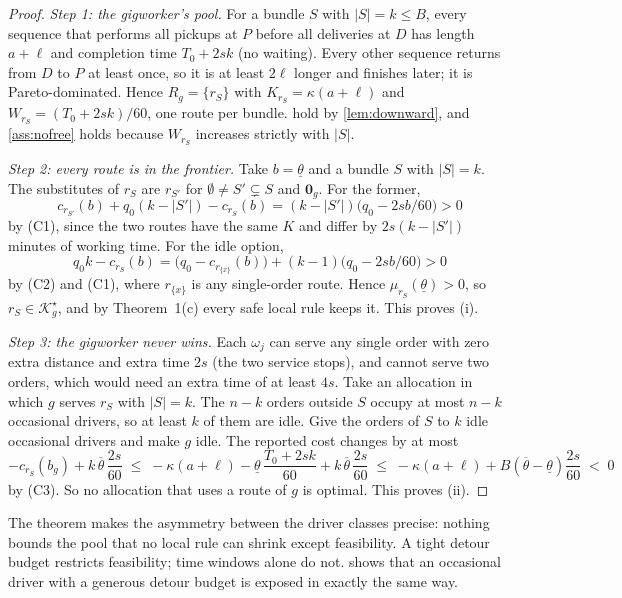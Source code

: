 \documentclass[11pt]{article}
\theoremstyle{definition}
\theoremstyle{remark}
\newcommand{\Ks}{\mathcal{K}^{\star}}
\newcommand{\thl}{\underline{\theta}}
\newcommand{\thu}{\overline{\theta}}
\newcommand{\idle}{\mathbf{0}}
\begin{document}
\begin{proof}
\emph{Step 1: the gigworker's pool.} For a bundle $S$ with $|S|=k\le B$, every
sequence that performs all pickups at $P$ before all deliveries at $D$ has
length $a+\ell$ and completion time $T_0+2sk$ (no waiting). Every other sequence
returns from $D$ to $P$ at least once, so it is at least $2\ell$ longer and
finishes later; it is Pareto-dominated. Hence $R_g=\{r_S\}$ with
$K_{r_S}=\kappa(a+\ell)$ and $W_{r_S}=(T_0+2sk)/60$, one route per bundle.
 hold by \cref{lem:downward}, and \cref{ass:nofree}
holds because $W_{r_S}$ increases strictly with $|S|$.

\emph{Step 2: every route is in the frontier.} Take $b=\thl$ and a bundle $S$
with $|S|=k$. The substitutes of $r_S$ are $r_{S'}$ for
$\emptyset\ne S'\subsetneq S$ and $\idle_g$. For the former,
\[
c_{r_{S'}}(b)+q_0(k-|S'|)-c_{r_S}(b)=(k-|S'|)\bigl(q_0-2sb/60\bigr)>0
\]
by (C1), since the two routes have the same $K$ and differ by $2s(k-|S'|)$
minutes of working time. For the idle option,
\[
q_0k-c_{r_S}(b)=\bigl(q_0-c_{r_{\{x\}}}(b)\bigr)+(k-1)\bigl(q_0-2sb/60\bigr)>0
\]
by (C2) and (C1), where $r_{\{x\}}$ is any single-order route. Hence
$\mu_{r_S}(\thl)>0$, so $r_S\in\Ks_g$, and by Theorem~1(c) every safe local
rule keeps it. This proves (i).

\emph{Step 3: the gigworker never wins.} Each $\omega_j$ can serve any single
order with zero extra distance and extra time $2s$ (the two service stops), and
cannot serve two orders, which would need an extra time of at least $4s$. Take
an allocation in which $g$ serves $r_S$ with $|S|=k$. The $n-k$ orders outside
$S$ occupy at most $n-k$ occasional drivers, so at least $k$ of them are idle.
Give the orders of $S$ to $k$ idle occasional drivers and make $g$ idle. The
reported cost changes by at most
\[
-c_{r_S}(b_g)+k\,\thu\,\frac{2s}{60}
\;\le\;-\kappa(a+\ell)-\thl\,\frac{T_0+2sk}{60}+k\,\thu\,\frac{2s}{60}
\;\le\;-\kappa(a+\ell)+B(\thu-\thl)\frac{2s}{60}\;<\;0
\]
by (C3). So no allocation that uses a route of $g$ is optimal. This proves (ii).
\end{proof}

The theorem makes the asymmetry between the driver classes precise: nothing
bounds the pool that no local rule can shrink except feasibility. A tight
detour budget restricts feasibility; time windows alone do not.
 shows that an occasional driver with a generous detour budget
is exposed in exactly the same way.

\end{document}
